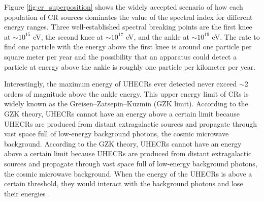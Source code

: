 Figure \ref{fig:cr_superposition} shows the widely accepted
scenario of how each population of CR sources dominates the
value of the spectral index for different energy ranges.
Three well-established spectral breaking points are the first knee
at $\sim10^{15}$ eV, the second knee at $\sim10^{17}$ eV,
and the ankle at $\sim10^{19}$ eV.
The rate to find one particle with the energy above the first knee
is around one particle per square meter per year and 
the possibility that an apparatus could detect
a particle at energy above the ankle is roughly one particle per 
kilometer per year.


Interestingly, the maximum energy of UHECRs ever detected never
exceed $\sim$2 orders of magnitude above the ankle energy.
This upper energy limit of CRs is widely known as the
Greisen–Zatsepin–Kuzmin (GZK limit).
According to the GZK theory, UHECRs cannot have an energy above
a certain limit because UHECRs are produced from distant
extragalactic sources and propagate through vast space full
of low-energy background photons, the cosmic microwave background. 
According to the GZK theory, UHECRs cannot have an energy above
a certain limit because UHECRs are produced from distant
extragalactic sources and propagate through vast space full
of low-energy background photons, the cosmic microwave background. 
When the energy of the UHECRs is above a certain threshold,
they would interact with the background photons and lose their
energies \citep{gzk_cr_limit}. 


